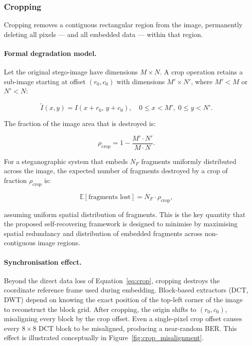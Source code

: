 \documentclass[12pt,a4paper,oneside]{report}
\begin{document}
	\subsubsection{Cropping}
	
	Cropping removes a contiguous rectangular region from the image, permanently deleting all
	pixels — and all embedded data — within that region.
	
	\paragraph{Formal degradation model.}
	Let the original stego-image have dimensions $M \times N$. A crop operation retains a
	sub-image starting at offset $(r_0, c_0)$ with dimensions $M' \times N'$, where
	$M' < M$ or $N' < N$:
	
	\begin{equation}
		\tilde{I}(x,y) = I(x + r_0,\, y + c_0), \quad
		0 \leq x < M',\; 0 \leq y < N'.
		\label{eq:crop}
	\end{equation}
	
	The fraction of the image area that is destroyed is:
	
	\begin{equation}
		\rho_\text{crop} = 1 - \frac{M' \cdot N'}{M \cdot N}.
		\label{eq:crop_fraction}
	\end{equation}
	
	For a steganographic system that embeds $N_F$ fragments uniformly distributed across the image,
	the expected number of fragments destroyed by a crop of fraction $\rho_\text{crop}$ is:
	
	\begin{equation}
		\mathbb{E}[\text{fragments lost}] = N_F \cdot \rho_\text{crop},
		\label{eq:crop_fragments}
	\end{equation}
	
	assuming uniform spatial distribution of fragments. This is the key quantity that the proposed
	self-recovering framework is designed to minimise by maximising spatial redundancy and
	distribution of embedded fragments across non-contiguous image regions.
	
	\paragraph{Synchronisation effect.}
	Beyond the direct data loss of Equation~\eqref{eq:crop}, cropping destroys the coordinate
	reference frame used during embedding. Block-based extractors (DCT, DWT) depend on knowing
	the exact position of the top-left corner of the image to reconstruct the block grid. After
	cropping, the origin shifts to $(r_0, c_0)$, misaligning every block by the crop offset. Even
	a single-pixel crop offset causes every $8 \times 8$ DCT block to be misaligned, producing
	a near-random BER. This effect is illustrated conceptually in
	Figure~\ref{fig:crop_misalignment}.
	
\end{document}
